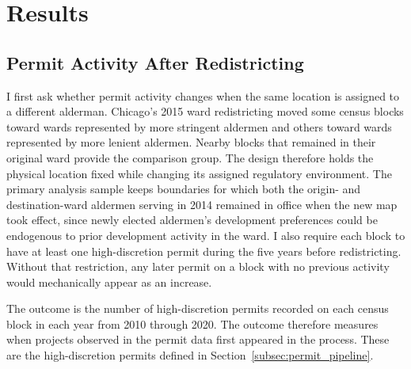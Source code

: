 
\section{Results}
\label{sec:empirical_results}

\subsection{Permit Activity After Redistricting}
\label{sec:empirical_results_permits}

I first ask whether permit activity changes when the same location is assigned to a different alderman.
Chicago's 2015 ward redistricting moved some census blocks toward wards represented by more stringent aldermen and others toward wards represented by more lenient aldermen.
Nearby blocks that remained in their original ward provide the comparison group.
The design therefore holds the physical location fixed while changing its assigned regulatory environment.
The primary analysis sample keeps boundaries for which both the origin- and destination-ward aldermen serving in 2014 remained in office when the new map took effect,
since newly elected aldermen's development preferences could be endogenous to prior development activity in the ward.
I also require each block to have at least one high-discretion permit during the five years before redistricting.
Without that restriction, any later permit on a block with no previous activity would mechanically appear as an increase.

The outcome is the number of high-discretion permits recorded on each census block in each year from 2010 through 2020.
The outcome therefore measures when projects observed in the permit data first appeared in the process.
These are the high-discretion permits defined in Section~\ref{subsec:permit_pipeline}.

